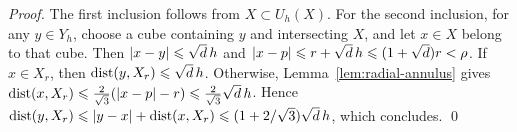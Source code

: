 \begin{proof}
The first inclusion follows from $X\subset U_h(X)$. For the second
inclusion, for any $y\in Y_h$, choose a cube containing $y$ and
intersecting $X$, and let $x\in X$ belong to that cube. Then
$|x-y|\leqslant\sqrt d\,h$ and $|x-p|\leqslant r+\sqrt d\,h\leqslant(1+\sqrt d)r<\rho$.
If $x\in X_r$, then $\operatorname{dist}(y,X_r)\leqslant\sqrt d\,h$.
Otherwise, Lemma~\ref{lem:radial-annulus} gives
$\operatorname{dist}(x,X_r) \leqslant\frac{2}{\sqrt3}(|x-p|-r)
\leqslant\frac{2}{\sqrt3}\sqrt d\,h$.  Hence
$\operatorname{dist}(y,X_r) \leqslant |y-x|+\operatorname{dist}(x,X_r)
\leqslant(1+2/\sqrt3)\sqrt d\,h$, which concludes. \qed
\end{proof}



